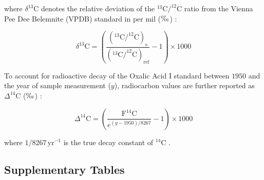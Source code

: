 \documentclass[preprint,12pt]{elsarticle}
\begin{document}
where $\delta^{13}\text{C}$ denotes the relative deviation of the $^{13}\text{C}/^{12}\text{C}$ ratio from the Vienna Pee Dee Belemnite (VPDB) standard in per mil ($\text{\textperthousand}$) \citep{Stuiver1977}:

\begin{equation}
\delta^{13}\text{C} = \left( \frac{\left(^{13}\text{C}/^{12}\text{C}\right)_{\text{s}}}{\left(^{13}\text{C}/^{12}\text{C}\right)_{\text{ref}}} - 1 \right) \times 1000
\end{equation}

To account for radioactive decay of the Oxalic Acid I standard between $1950$ and the year of sample measurement ($y$), radiocarbon values are further reported as $\Delta^{14}\text{C}$ ($\text{\textperthousand}$) \citep{Trumbore2016}:

\begin{equation}
\Delta^{14}\text{C} = \left( \frac{\text{F}^{14}\text{C}}{e^{(y - 1950)/8267}} - 1 \right) \times 1000
\end{equation}

where $1/8267\,\text{yr}^{-1}$ is the true decay constant of $^{14}\text{C}$ \citep{Trumbore2016}.

\clearpage

\subsection{Supplementary Tables}
\label{sec:si_tables}
  
\end{document}
